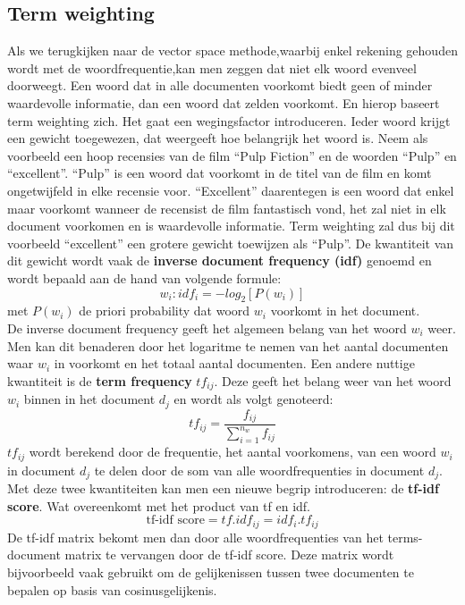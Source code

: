\subsection{Term weighting}\label{Term weighting}

Als we terugkijken naar de vector space methode,waarbij enkel rekening gehouden wordt met de woordfrequentie,kan men zeggen dat niet elk woord evenveel doorweegt. Een woord dat in alle documenten voorkomt biedt geen of minder waardevolle informatie, dan een woord dat zelden voorkomt. En hierop baseert term weighting zich. Het gaat een wegingsfactor introduceren. Ieder woord krijgt een gewicht toegewezen, dat weergeeft hoe belangrijk het woord is. Neem als voorbeeld een hoop recensies van de film ``Pulp Fiction'' en de woorden ``Pulp'' en ``excellent''. ``Pulp'' is een woord dat voorkomt in de titel van de film en komt ongetwijfeld in elke recensie voor. ``Excellent'' daarentegen is een woord dat enkel maar voorkomt wanneer de recensist de film fantastisch vond, het zal niet in elk document voorkomen en is waardevolle informatie. Term weighting zal dus bij dit voorbeeld ``excellent'' een grotere gewicht toewijzen als ``Pulp''. 
%
De kwantiteit van dit gewicht wordt vaak de \textbf{inverse document frequency  (idf)} genoemd en wordt bepaald aan de hand van volgende formule:
\[w_{i}: idf_{i} = -log_{2}[P(w_{i})] \]
met $P(w_{i})$ de priori probability dat woord $w_{i}$ voorkomt in het document.\\
%
De inverse document frequency geeft het algemeen belang van het woord $w_{i}$ weer. Men kan dit benaderen door het logaritme te nemen van het aantal documenten waar $w_{i}$ in voorkomt en het totaal aantal documenten.
Een andere nuttige kwantiteit is de  \textbf{term frequency} $tf_{ij}$. Deze geeft het belang weer van het woord $w_{i}$ binnen in het document $d_{j}$  en wordt als volgt genoteerd:
\[ tf_{ij} = \frac{f_{ij}}{ \sum_{i=1}^{n_{w}}f_{ij}} \]
%
$tf_{ij}$ wordt berekend door de frequentie, het aantal voorkomens, van een woord $w_{i}$ in document $d_{j}$ te delen door de som van alle woordfrequenties in document $d_{j}$.
Met deze twee kwantiteiten kan men een nieuwe begrip introduceren: de \textbf{tf-idf score}. Wat overeenkomt met het product van tf en idf.
\[ \text{tf-idf score} = tf . idf_{ij} = idf_{i} . tf_{ij} \]
%
De tf-idf matrix bekomt men dan door alle woordfrequenties van het terms-document matrix te vervangen door de tf-idf score.
Deze matrix wordt bijvoorbeeld vaak gebruikt om de gelijkenissen tussen twee documenten te bepalen op basis van cosinusgelijkenis.


